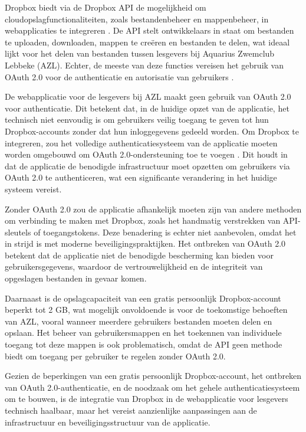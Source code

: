 Dropbox biedt via de Dropbox API de mogelijkheid om cloudopslagfunctionaliteiten, zoals bestandenbeheer en mappenbeheer, in webapplicaties te integreren \autocite{dropbox_api}. 
De API stelt ontwikkelaars in staat om bestanden te uploaden, downloaden, mappen te creëren en bestanden te delen, wat ideaal lijkt voor het delen van 
bestanden tussen lesgevers bij Aquarius Zwemclub Lebbeke (AZL). Echter, de meeste van deze functies vereisen het gebruik van OAuth 2.0 voor de authenticatie 
en autorisatie van gebruikers \autocite{dropbox_oauth}.

De webapplicatie voor de lesgevers bij AZL maakt geen gebruik van OAuth 2.0 voor authenticatie. Dit betekent dat, in de huidige opzet van de applicatie, 
het technisch niet eenvoudig is om gebruikers veilig toegang te geven tot hun Dropbox-accounts zonder dat hun inloggegevens gedeeld worden. Om Dropbox te 
integreren, zou het volledige authenticatiesysteem van de applicatie moeten worden omgebouwd om OAuth 2.0-ondersteuning toe te voegen \autocite{dropbox_oauth}. Dit houdt in dat de 
applicatie de benodigde infrastructuur moet opzetten om gebruikers via OAuth 2.0 te authenticeren, wat een significante verandering in het huidige systeem vereist.

Zonder OAuth 2.0 zou de applicatie afhankelijk moeten zijn van andere methoden om verbinding te maken met Dropbox, zoals het handmatig verstrekken van API-sleutels 
of toegangstokens. Deze benadering is echter niet aanbevolen, omdat het in strijd is met moderne beveiligingspraktijken. Het ontbreken van OAuth 2.0 betekent 
dat de applicatie niet de benodigde bescherming kan bieden voor gebruikersgegevens, waardoor de vertrouwelijkheid en de integriteit van opgeslagen bestanden 
in gevaar komen.

Daarnaast is de opslagcapaciteit van een gratis persoonlijk Dropbox-account beperkt tot 2 GB, wat mogelijk onvoldoende is voor de toekomstige behoeften van AZL, 
vooral wanneer meerdere gebruikers bestanden moeten delen en opslaan. Het beheer van gebruikersmappen en het toekennen van individuele toegang tot deze 
mappen is ook problematisch, omdat de API geen methode biedt om toegang per gebruiker te regelen zonder OAuth 2.0.

Gezien de beperkingen van een gratis persoonlijk Dropbox-account, het ontbreken van OAuth 2.0-authenticatie, en de noodzaak om het gehele authenticatiesysteem 
om te bouwen, is de integratie van Dropbox in de webapplicatie voor lesgevers technisch haalbaar, maar het vereist aanzienlijke aanpassingen aan de infrastructuur 
en beveiligingsstructuur van de applicatie.

